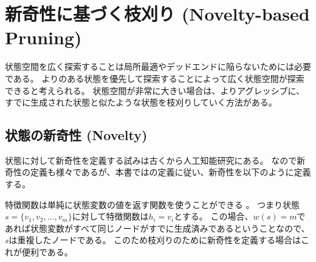 \section{新奇性に基づく枝刈り (Novelty-based Pruning)}
\label{sec:novelty-based-pruning}


状態空間を広く探索することは局所最適やデッドエンドに陥らないためには必要である。
よりのある状態を優先して探索することによって広く状態空間が探索できると考えられる。
状態空間が非常に大きい場合は、よりアグレッシブに、すでに生成された状態と似たような状態を枝刈りしていく方法がある。




\subsection{状態の新奇性 (Novelty)}
\label{sec:novelty}

状態に対して新奇性を定義する試みは古くから人工知能研究にある\cite{lehman2008exploiting}。
なので新奇性の定義も様々であるが、本書では\cite{geffner2015}の定義に従い、新奇性を以下のように定義する。


特徴関数は単純に状態変数の値を返す関数を使うことができる \cite{geffner2015, lipovetzky2015a}。
つまり状態$s = \{v_1, v_2,...,v_m\}$に対して特徴関数は$h_i = v_i$とする。
この場合、$w(s) = m$であれば状態変数がすべて同じノードがすでに生成済みであるということなので、$s$は重複したノードである。
このため枝刈りのために新奇性を定義する場合はこれが便利である。



